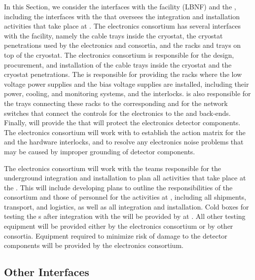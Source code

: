 In this Section, we consider the interfaces with the facility (LBNF)
and the  , including the
interfaces with the  that oversees the integration
and installation activities that take place at .
The  electronics consortium has several
interfaces with the facility, namely the cable trays inside the
cryostat, the cryostat penetrations used by the  electronics
and  consortia, and the racks and trays on top
of the cryostat. The  electronics consortium is responsible
for the design, procurement, and installation of the cable trays
inside the cryostat and the cryostat penetrations. The 
 is responsible for providing the racks
where the low voltage power supplies and the bias voltage supplies are installed,
including their power, cooling, and monitoring systems, and the interlocks.
 is also responsible for the trays connecting these racks 
to the corresponding  and for the network switches that
connect the controls for the  electronics to the
 and  back-ends. Finally,  will
provide the  that will protect
the  electronics detector components. The  electronics
consortium will work with  to establish
the action matrix for the  and the hardware
interlocks, and to resolve any electronics noise problems
that may be caused by improper grounding of detector components.

The  electronics consortium will work with the teams responsible
for the underground integration and installation
to plan all activities that take place at the .
This will include developing plans to outline the responsibilities
of the consortium and those of  personnel
for the activities at , including all 
shipments, transport, and logistics, as well as all
integration and installation. Cold boxes for testing
the s after integration with the  will be 
provided by  at .
All other testing equipment will be provided either by the  electronics
consortium or by other consortia. Equipment required to
minimize risk of  damage to the detector components
will  be provided by the  electronics consortium. 

\subsection{Other Interfaces}
\label{sec:fdsp-tpcelec-interfaces-other}

